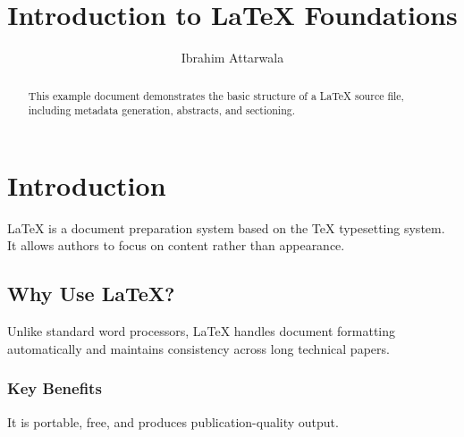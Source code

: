 \documentclass[12pt]{article}
\title{Introduction to LaTeX Foundations}
\author{Ibrahim Attarwala}
\begin{document}
\maketitle

\begin{abstract}
This example document demonstrates the basic structure of a LaTeX source file, including metadata generation, abstracts, and sectioning.
\end{abstract}

\section{Introduction}
LaTeX is a document preparation system based on the TeX typesetting system. It allows authors to focus on content rather than appearance.

\subsection{Why Use LaTeX?}
Unlike standard word processors, LaTeX handles document formatting automatically and maintains consistency across long technical papers.

\subsubsection{Key Benefits}
It is portable, free, and produces publication-quality output.
\end{document}
